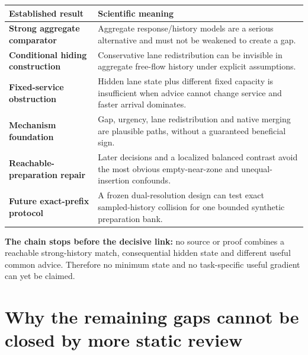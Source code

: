 \documentclass[10pt]{article}
\newcommand{\key}[1]{\textbf{\color{navy}#1}}
\begin{document}
\begin{tabularx}{\textwidth}{>{\bfseries}p{} X}
\toprule
Established result & Scientific meaning \\
\midrule
Strong aggregate comparator & Aggregate response/history models are a serious
alternative and must not be weakened to create a gap. \\
Conditional hiding construction & Conservative lane redistribution can be
invisible in aggregate free-flow history under explicit assumptions. \\
Fixed-service obstruction & Hidden lane state plus different fixed capacity is
insufficient when advice cannot change service and faster arrival dominates. \\
Mechanism foundation & Gap, urgency, lane redistribution and native merging are
plausible paths, without a guaranteed beneficial sign. \\
Reachable-preparation repair & Later decisions and a localized balanced contrast
avoid the most obvious empty-near-zone and unequal-insertion confounds. \\
Future exact-prefix protocol & A frozen dual-resolution design can test exact
sampled-history collision for one bounded synthetic preparation bank. \\
\bottomrule
\end{tabularx}

\vspace{2mm}
\key{The chain stops before the decisive link:} no source or proof combines a
reachable strong-history match, consequential hidden state and different useful
common advice. Therefore no minimum state and no task-specific useful gradient
can yet be claimed.

\section{Why the remaining gaps cannot be closed by more static review}
\end{document}
